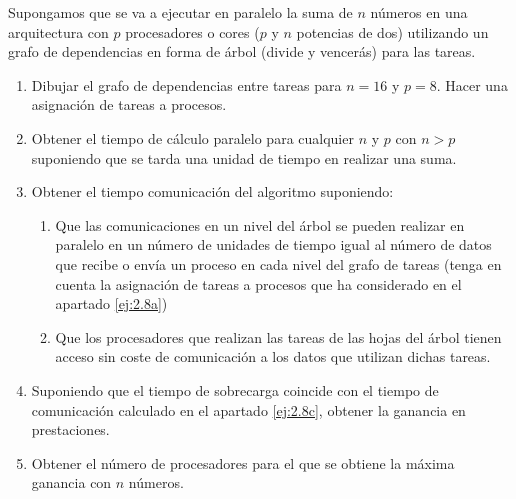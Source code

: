 \begin{ejercicio}
    Supongamos que se va a ejecutar en paralelo la suma de $n$ números en una arquitectura con $p$
    procesadores o cores ($p$ y $n$ potencias de dos) utilizando un grafo de dependencias en forma de árbol (divide
    y vencerás) para las tareas.
    \begin{enumerate}
        \item\label{ej:2.8a} Dibujar el grafo de dependencias entre tareas para $n=16$ y $p=8$. Hacer una asignación de tareas
        a procesos.
        \item Obtener el tiempo de cálculo paralelo para cualquier $n$ y $p$ con $n>p$ suponiendo que se tarda una
        unidad de tiempo en realizar una suma.
        \item\label{ej:2.8c} Obtener el tiempo comunicación del algoritmo suponiendo:
        \begin{enumerate}
            \item Que las comunicaciones en un nivel del árbol se pueden realizar en paralelo en un número de unidades de tiempo igual al número de
            datos que recibe o envía un proceso en cada nivel del grafo de tareas (tenga en cuenta la asignación
            de tareas a procesos que ha considerado en el apartado \ref{ej:2.8a})
            \item Que los procesadores que realizan las tareas de las hojas del árbol tienen acceso sin coste de comunicación a los datos que utilizan
            dichas tareas.
        \end{enumerate}

        \item Suponiendo que el tiempo de sobrecarga coincide con el tiempo de comunicación calculado en el apartado \ref{ej:2.8c}, obtener la ganancia en prestaciones.
        \item Obtener el número de procesadores para el que se obtiene la máxima ganancia con $n$ números.
    \end{enumerate}
\end{ejercicio}

